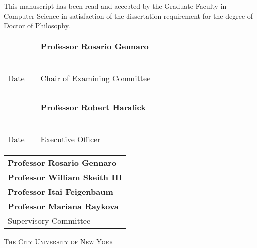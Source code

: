 \begin{center}
This manuscript has been read and accepted by the Graduate Faculty in Computer Science in satisfaction of the dissertation requirement for the degree of Doctor of Philosophy.
\end{center}

\vspace{0.75in}

\begin{tabular}{p{1.75in}p{0.5in}p{3.5in}}
~                                   & & \textbf{Professor Rosario Gennaro}\\
~                                   & & \\
\hrulefill                          & &\hrulefill \\
Date                                & & Chair of Examining Committee\\
~                                   & & \\
~                                   & & \textbf{Professor Robert Haralick}\\
~                                   & & \\
\hrulefill                          & &\hrulefill \\
Date                                & & Executive Officer\\
\end{tabular}

\vspace{0.75in}

\begin{tabular}{l}
\textbf{Professor Rosario Gennaro} \\
\textbf{Professor William Skeith III} \\
\textbf{Professor Itai Feigenbaum} \\
\textbf{Professor Mariana Raykova} \\
Supervisory Committee \\
\end{tabular}


\vspace{\fill}
\begin{center}
\textsc{The City University of New York}
\end{center}